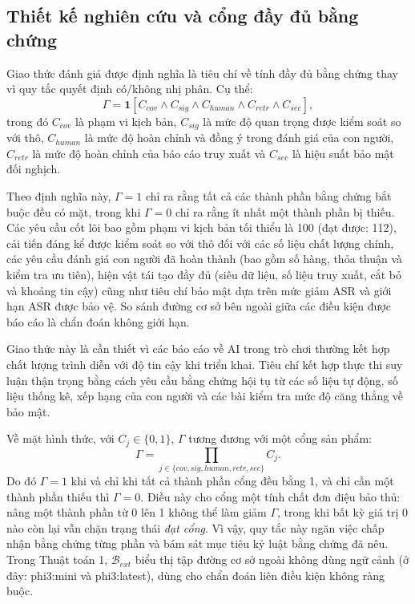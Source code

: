 ﻿\documentclass[a4paper,12pt]{article}
\newcommand{\ind}{\mathbf{1}}
\begin{document}
\subsection{Thiết kế nghiên cứu và cổng đầy đủ bằng chứng}
Giao thức đánh giá được định nghĩa là tiêu chí về tính đầy đủ bằng chứng thay vì quy tắc quyết định có/không nhị phân. Cụ thể:
\begin{equation}
\Gamma = \ind\!\left[C_{cov}\land C_{sig}\land C_{human}\land C_{retr}\land C_{sec}\right],
\end{equation}
trong đó \(C_{cov}\) là phạm vi kịch bản, \(C_{sig}\) là mức độ quan trọng được kiểm soát so với thô, \(C_{human}\) là mức độ hoàn chỉnh và đồng ý trong đánh giá của con người, \(C_{retr}\) là mức độ hoàn chỉnh của báo cáo truy xuất và \(C_{sec}\) là hiệu suất bảo mật đối nghịch.

Theo định nghĩa này, \(\Gamma=1\) chỉ ra rằng tất cả các thành phần bằng chứng bắt buộc đều có mặt, trong khi \(\Gamma=0\) chỉ ra rằng ít nhất một thành phần bị thiếu. Các yêu cầu cốt lõi bao gồm phạm vi kịch bản tối thiểu là 100 (đạt được: 112), cải tiến đáng kể được kiểm soát so với thô đối với các số liệu chất lượng chính, các yêu cầu đánh giá con người đã hoàn thành (bao gồm số hàng, thỏa thuận và kiểm tra ưu tiên), hiện vật tái tạo đầy đủ (siêu dữ liệu, số liệu truy xuất, cắt bỏ và khoảng tin cậy) cũng như tiêu chí bảo mật dựa trên mức giảm ASR và giới hạn ASR được bảo vệ. So sánh đường cơ sở bên ngoài giữa các điều kiện được báo cáo là chẩn đoán không giới hạn.

Giao thức này là cần thiết vì các báo cáo về AI trong trò chơi thường kết hợp chất lượng trình diễn với độ tin cậy khi triển khai. Tiêu chí kết hợp thực thi suy luận thận trọng bằng cách yêu cầu bằng chứng hội tụ từ các số liệu tự động, số liệu thống kê, xếp hạng của con người và các bài kiểm tra mức độ căng thẳng về bảo mật.

Về mặt hình thức, với \(C_j\in\{0,1\}\), \(\Gamma\) tương đương với một cổng sản phẩm:
\begin{equation}
\Gamma=\prod_{j\in\{cov,sig,human,retr,sec\}} C_j.
\end{equation}
Do đó \(\Gamma=1\) khi và chỉ khi tất cả thành phần cổng đều bằng 1, và chỉ cần một thành phần thiếu thì \(\Gamma=0\). Điều này cho cổng một tính chất đơn điệu bảo thủ: nâng một thành phần từ 0 lên 1 không thể làm giảm \(\Gamma\), trong khi bất kỳ giá trị 0 nào còn lại vẫn chặn trạng thái \emph{đạt cổng}. Vì vậy, quy tắc này ngăn việc chấp nhận bằng chứng từng phần và bám sát mục tiêu kỷ luật bằng chứng đã nêu. Trong Thuật toán 1, \(\mathcal{B}_{ext}\) biểu thị tập đường cơ sở ngoài không dùng ngữ cảnh (ở đây: phi3:mini và phi3:latest), dùng cho chẩn đoán liên điều kiện không ràng buộc.
\end{document}
